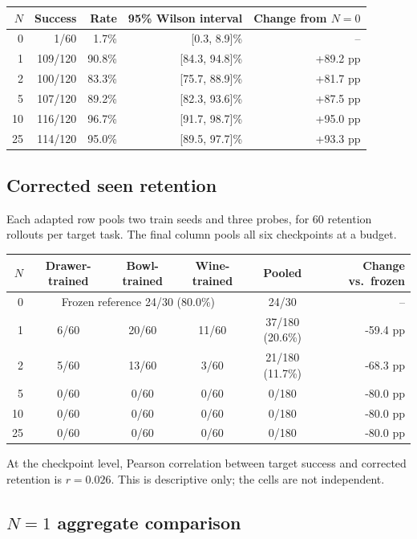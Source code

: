\documentclass[9pt]{extarticle}
\begin{document}
\begin{center}
\begin{tabular}{@{}rrrrr@{}}
\toprule
\(N\) & Success & Rate & 95\% Wilson interval & Change from \(N=0\)\\
\midrule
0 & 1/60 & 1.7\% & [0.3, 8.9]\% & --\\
1 & 109/120 & 90.8\% & [84.3, 94.8]\% & +89.2 pp\\
2 & 100/120 & 83.3\% & [75.7, 88.9]\% & +81.7 pp\\
5 & 107/120 & 89.2\% & [82.3, 93.6]\% & +87.5 pp\\
10 & 116/120 & 96.7\% & [91.7, 98.7]\% & +95.0 pp\\
25 & 114/120 & 95.0\% & [89.5, 97.7]\% & +93.3 pp\\
\bottomrule
\end{tabular}
\end{center}

\subsection{Corrected seen retention}

Each adapted row pools two train seeds and three probes, for 60 retention
rollouts per target task. The final column pools all six checkpoints at a budget.

\begin{center}
\begin{tabular}{@{}rccccr@{}}
\toprule
\(N\) & Drawer-trained & Bowl-trained & Wine-trained & Pooled & Change vs.\ frozen\\
\midrule
0 & \multicolumn{3}{c}{Frozen reference 24/30 (80.0\%)} & 24/30 & --\\
1 & 6/60 & 20/60 & 11/60 & 37/180 (20.6\%) & -59.4 pp\\
2 & 5/60 & 13/60 & 3/60 & 21/180 (11.7\%) & -68.3 pp\\
5 & 0/60 & 0/60 & 0/60 & 0/180 & -80.0 pp\\
10 & 0/60 & 0/60 & 0/60 & 0/180 & -80.0 pp\\
25 & 0/60 & 0/60 & 0/60 & 0/180 & -80.0 pp\\
\bottomrule
\end{tabular}
\end{center}

At the checkpoint level, Pearson correlation between target success and corrected
retention is \(r=0.026\). This is descriptive only; the cells are not independent.

\subsection{\texorpdfstring{\(N=1\)}{N=1} aggregate comparison}
\end{document}
